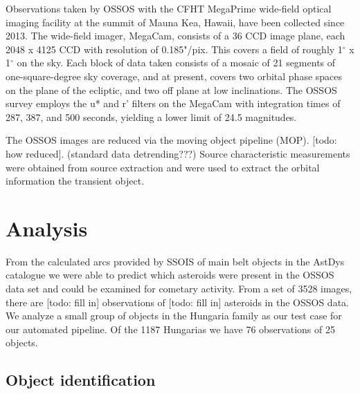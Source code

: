 \documentclass[iop,apj]{emulateapj}
\begin{document}
Observations taken by OSSOS with the CFHT MegaPrime wide-field optical imaging facility  at the summit of Mauna Kea, Hawaii, have been collected since 2013. The wide-field imager, MegaCam, consists of a 36 CCD image plane, each 2048 x 4125 CCD with resolution of 0.185"/pix. This covers a field of  roughly 1$^{\circ}$ x 1$^{\circ}$ on the sky. Each block of data taken consists of a mosaic of 21 segments of one-square-degree sky coverage, and at present, covers two orbital phase spaces on the plane of the ecliptic, and two off plane at low inclinations. The OSSOS survey employs the u* and r' filters on the MegaCam with integration times of 287, 387, and 500 seconds, yielding a lower limit of 24.5 magnitudes.

The OSSOS images are reduced via the moving object pipeline (MOP). [todo: how reduced]. (standard data detrending???) Source characteristic measurements were obtained from source extraction \citep{sep} and were used to extract the orbital information the transient object. 



\section{Analysis}

From the calculated arcs provided by SSOIS \citep{ssois} of main belt objects in the AstDys catalogue \citep{astdys} we were able to predict which asteroids were present in the OSSOS data set and could be examined for cometary activity. From a set of 3528 images, there are [todo: fill in] observations of [todo: fill in] asteroids in the OSSOS data. We analyze a small group of objects in the Hungaria family as our test case for our automated pipeline. Of the 1187 Hungarias we have 76 observations of 25 objects. 

\subsection{Object identification}
\end{document}
